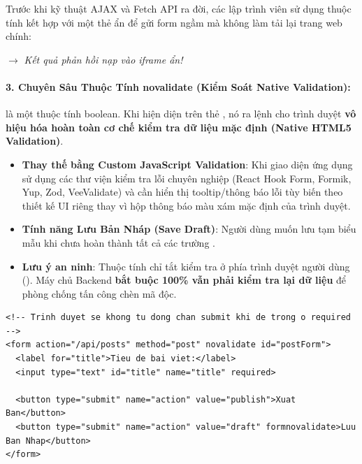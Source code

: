 \begin{tipBox}
Trước khi kỹ thuật AJAX và Fetch API ra đời, các lập trình viên sử dụng thuộc tính  kết hợp với một thẻ  ẩn để gửi form ngầm mà không làm tải lại trang web chính:
\begin{center}
 \quad $\rightarrow$ \textit{Kết quả phản hồi nạp vào iframe ẩn!}
\end{center}
\end{tipBox}

\paragraph{3. Chuyên Sâu Thuộc Tính novalidate (Kiểm Soát Native Validation):}
 là một thuộc tính boolean. Khi hiện diện trên thẻ , nó ra lệnh cho trình duyệt \textbf{vô hiệu hóa hoàn toàn cơ chế kiểm tra dữ liệu mặc định (Native HTML5 Validation)}.

\begin{conceptBox}
\begin{itemize}[leftmargin=1.5em, itemsep=3pt, parsep=0pt]
    \item \textbf{Thay thế bằng Custom JavaScript Validation}: Khi giao diện ứng dụng sử dụng các thư viện kiểm tra lỗi chuyên nghiệp (React Hook Form, Formik, Yup, Zod, VeeValidate) và cần hiển thị tooltip/thông báo lỗi tùy biến theo thiết kế UI riêng thay vì hộp thông báo màu xám mặc định của trình duyệt.
    \item \textbf{Tính năng Lưu Bản Nháp (Save Draft)}: Người dùng muốn lưu tạm biểu mẫu khi chưa hoàn thành tất cả các trường .
    \item \textbf{Lưu ý an ninh}: Thuộc tính  chỉ tắt kiểm tra ở phía trình duyệt người dùng (). Máy chủ Backend \textbf{bắt buộc 100\% vẫn phải kiểm tra lại dữ liệu} để phòng chống tấn công chèn mã độc.
\end{itemize}
\end{conceptBox}

\begin{codeWindow}
\begin{lstlisting}[language=HTML5]
<!-- Trinh duyet se khong tu dong chan submit khi de trong o required -->
<form action="/api/posts" method="post" novalidate id="postForm">
  <label for="title">Tieu de bai viet:</label>
  <input type="text" id="title" name="title" required>
  
  <button type="submit" name="action" value="publish">Xuat Ban</button>
  <button type="submit" name="action" value="draft" formnovalidate>Luu Ban Nhap</button>
</form>
\end{lstlisting}
\end{codeWindow}

